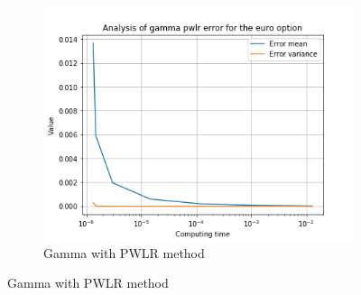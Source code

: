 \documentclass[12pt,a4paper,fleqn]{article}
\begin{document}
\begin{figure}
\begin{subfigure}[b]{0.3\textwidth}
          \includegraphics[width=\textwidth]{graphs/eurogammapwlrtime.png}
          \caption{Gamma with PWLR method}
      \end{subfigure}


\end{figure}
\end{document}
